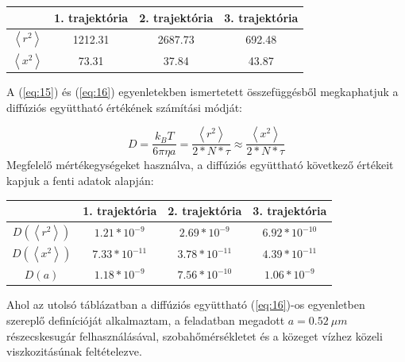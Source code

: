 \begin{center}
\label{tab:5}
\begin{tabular}{||c|c|c|c||}
    \toprule
                            & 1. trajektória  & 2. trajektória  & 3. trajektória  \\ \hline \hline
    $\left< r^{2} \right>$  & 1212.31         & 2687.73         & 692.48          \\ \hline
    $\left< x^{2} \right>$  & 73.31           & 37.84           & 43.87           \\
    \bottomrule
\end{tabular}
\end{center}
A (\ref{eq:15}) és (\ref{eq:16}) egyenletekben ismertetett összefüggésből megkaphatjuk a diffúziós együttható értékének számítási módját:

\begin{equation}
    D
    =
    \frac{k_{B} T}{6 \pi \eta a}
    =
    \frac{\left< r^{2} \right>}{2 * N * \tau}
    \approx
    \frac{\left< x^{2} \right>}{2 * N * \tau}
\end{equation}
Megfelelő mértékegységeket használva, a diffúziós együttható következő értékeit kapjuk a fenti adatok alapján:

\begin{center}
\label{tab:6}
\begin{tabular}{||c|c|c|c||}
    \toprule
                                             & 1. trajektória  & 2. trajektória  & 3. trajektória  \\ \hline \hline
    $D \left( \left< r^{2} \right> \right)$  & $1.21*10^{-9}$  & $2.69*10^{-9}$  & $6.92*10^{-10}$ \\ \hline
    $D \left( \left< x^{2} \right> \right)$  & $7.33*10^{-11}$ & $3.78*10^{-11}$ & $4.39*10^{-11}$ \\ \hline
    $D \left( a \right)$                     & $1.18*10^{-9}$  & $7.56*10^{-10}$ & $1.06*10^{-9}$  \\
    \bottomrule
\end{tabular}
\end{center}
Ahol az utolsó táblázatban a diffúziós együttható (\ref{eq:16})-os egyenletben szereplő definícióját alkalmaztam, a feladatban megadott $a = 0.52\ \mu m$ részecskesugár felhasználásával, szobahőmérsékletet és a közeget vízhez közeli viszkozitásúnak feltételezve.